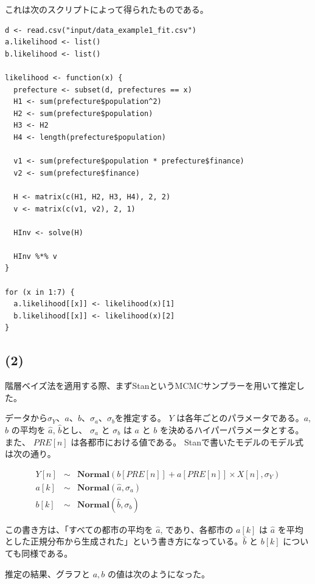\documentclass[a4j,xelatex,ja=standard,jafont=hiragino-pron, 9pt]{bxjsarticle}
\begin{document}
これは次のスクリプトによって得られたものである。

\begin{lstlisting}
d <- read.csv("input/data_example1_fit.csv")
a.likelihood <- list()
b.likelihood <- list()

likelihood <- function(x) {
  prefecture <- subset(d, prefectures == x)
  H1 <- sum(prefecture$population^2)
  H2 <- sum(prefecture$population)
  H3 <- H2
  H4 <- length(prefecture$population)

  v1 <- sum(prefecture$population * prefecture$finance)
  v2 <- sum(prefecture$finance)

  H <- matrix(c(H1, H2, H3, H4), 2, 2)
  v <- matrix(c(v1, v2), 2, 1)

  HInv <- solve(H)

  HInv %*% v
}

for (x in 1:7) {
  a.likelihood[[x]] <- likelihood(x)[1]
  b.likelihood[[x]] <- likelihood(x)[2]
}
\end{lstlisting}

\subsection*{(2)}

階層ベイズ法を適用する際、まずStanというMCMCサンプラーを用いて推定した。

データから\(\sigma_Y\)、\(a\)、\(b\)、\(\sigma_a\)、\(\sigma_b\)を推定する。
\(Y\) は各年ごとのパラメータである。\(a\), \(b\) の平均を \(\hat{a}\),
\(\hat{b}\)とし、 \(\sigma_a\) と \(\sigma_b\) は \(a\) と \(b\)
を決めるハイパーパラメータとする。また、 \(PRE[n]\)
は各都市における値である。 Stanで書いたモデルのモデル式は次の通り。

\begin{eqnarray}
  Y[n] &\sim& \textbf{Normal}(b[PRE[n]] + a[PRE[n]] \times X[n], \sigma_Y) \\
  a[k] &\sim& \textbf{Normal}(\hat{a}, \sigma_a) \\
  b[k] &\sim& \textbf{Normal}(\hat{b}, \sigma_b)
\end{eqnarray}

この書き方は、「すべての都市の平均を \(\hat{a}\), であり、各都市の
\(a[k]\) は \(\hat{a}\)
を平均とした正規分布から生成された」という書き方になっている。\(\hat{b}\)
と \(b[k]\) についても同様である。

推定の結果、グラフと $a, b$ の値は次のようになった。
\end{document}
